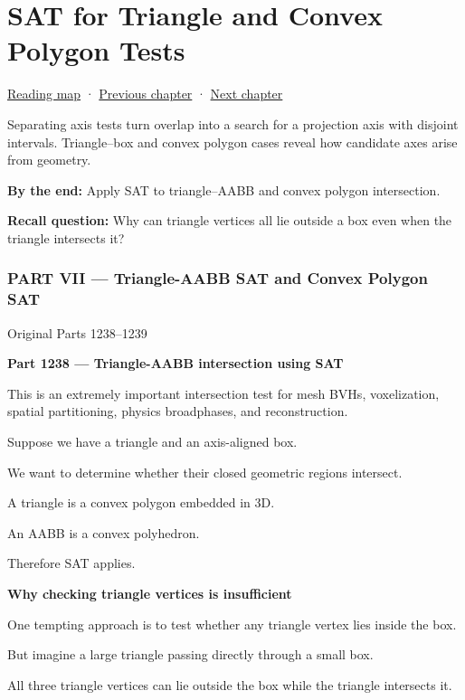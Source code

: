 \hypertarget{04-visual-computing-ii-ch025}{}
\chapter{SAT for Triangle and Convex Polygon Tests}\label{04-visual-computing-ii-ch025-sat-for-triangle-and-convex-polygon-tests}

\hyperref[volume-reading-map]{Reading map} · \hyperref[04-visual-computing-ii-ch024-raytriangle-intersection]{Previous chapter} · \hyperref[04-visual-computing-ii-ch026-contact-features-and-manifolds]{Next chapter}

Separating axis tests turn overlap into a search for a projection axis with disjoint intervals. Triangle--box and convex polygon cases reveal how candidate axes arise from geometry.

\textbf{By the end:} Apply SAT to triangle--AABB and convex polygon intersection.

\textbf{Recall question:} Why can triangle vertices all lie outside a box even when the triangle intersects it?

\subsection{PART VII --- Triangle-AABB SAT and Convex Polygon SAT}\label{04-visual-computing-ii-ch025-part-vii-triangle-aabb-sat-and-convex-polygon-sat}

Original Parts 1238--1239

\textbf{Part 1238 --- Triangle-AABB intersection using SAT}

This is an extremely important intersection test for mesh BVHs, voxelization, spatial partitioning, physics broadphases, and reconstruction.

Suppose we have a triangle and an axis-aligned box.

We want to determine whether their closed geometric regions intersect.

A triangle is a convex polygon embedded in 3D.

An AABB is a convex polyhedron.

Therefore SAT applies.

\textbf{Why checking triangle vertices is insufficient}

One tempting approach is to test whether any triangle vertex lies inside the box.

But imagine a large triangle passing directly through a small box.

All three triangle vertices can lie outside the box while the triangle intersects it.

